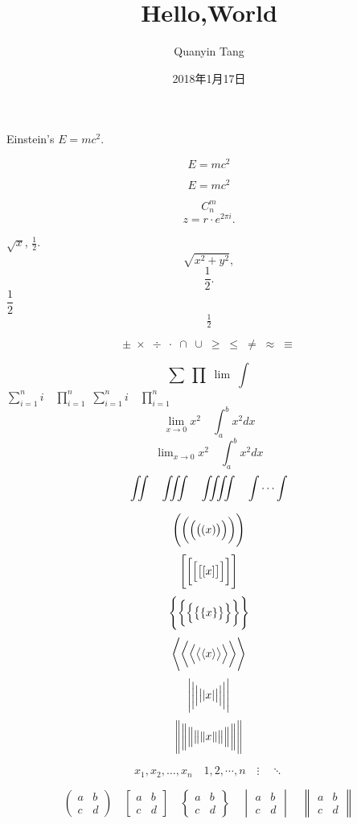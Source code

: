 \documentclass[UTF8]{ctexart}
\title{Hello,World}
\author{Quanyin Tang}
\date{2018年1月17日}
\begin{document}
\maketitle

Einstein's $E=mc^2$. %

\[ E=mc^2 \]  %

\begin{equation} %
E=mc^2
\end{equation}

\[C^m_n\]		%
\[ z = r\cdot e^{2\pi i}. \] %

$\sqrt{x}$, $\frac{1}{2}$.
\[ \sqrt{x^2+y^2}, \]
\[ \frac{1}{2}. \]
$\dfrac{1}{2}$ %
\[ \tfrac{1}{2} \]%

\[ \pm\; \times \; \div\; \cdot\; \cap\; \cup\; \geq\; \leq\; \neq\; \approx \; \equiv \] 

\[ \sum\; \prod\;  \lim\;  \int \] 
$ \sum_{i=1}^n i\quad \prod_{i=1}^n $
$ \sum\limits _{i=1}^n i\quad \prod\limits _{i=1}^n $ %
\[ \lim_{x\to0}x^2 \quad \int_a^b x^2 dx \]
\[ \lim\nolimits _{x\to0}x^2\quad \int\nolimits_a^b x^2 dx \]
\[ \iint\quad \iiint\quad \iiiint\quad \idotsint \] %

\[ \Biggl(\biggl(\Bigl(\bigl((x)\bigr)\Bigr)\biggr)\Biggr) \] 
\[ \Biggl[\biggl[\Bigl[\bigl[[x]\bigr]\Bigr]\biggr]\Biggr] \]
\[ \Biggl \{\biggl \{\Bigl \{\bigl \{\{x\}\bigr \}\Bigr \}\biggr \}\Biggr\} \]
\[ \Biggl\langle\biggl\langle\Bigl\langle\bigl\langle\langle x
\rangle\bigr\rangle\Bigr\rangle\biggr\rangle\Biggr\rangle \]
\[ \Biggl\lvert\biggl\lvert\Bigl\lvert\bigl\lvert\lvert x
\rvert\bigr\rvert\Bigr\rvert\biggr\rvert\Biggr\rvert \]
\[ \Biggl\lVert\biggl\lVert\Bigl\lVert\bigl\lVert\lVert x
\rVert\bigr\rVert\Bigr\rVert\biggr\rVert\Biggr\rVert \]

\[ x_1,x_2,\dots ,x_n\quad 1,2,\cdots ,n\quad
\vdots\quad \ddots \]

\[ 
\begin{pmatrix} a&b\\c&d \end{pmatrix} \quad
\begin{bmatrix} a&b\\c&d \end{bmatrix} \quad
\begin{Bmatrix} a&b\\c&d \end{Bmatrix} \quad
\begin{vmatrix} a&b\\c&d \end{vmatrix} \quad
\begin{Vmatrix} a&b\\c&d \end{Vmatrix} 
\]
\end{document}
